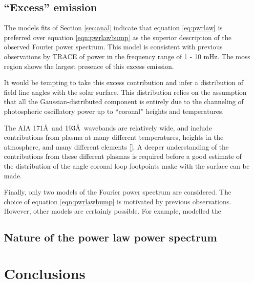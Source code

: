 \documentclass[manuscript]{../aastex52/aastex}
\begin{document}
\subsection{``Excess'' emission}\label{ssec:excess}
The models fits of Section \ref{sec:anal} indicate that equation
\ref{eq:pwrlaw} is preferred over equation \ref{eqn:pwrlawbump} as the
superior description of the observed Fourier power spectrum.  This
model is consistent with previous observations by TRACE of power in
the frequency range of 1 - 10 mHz.  The moss region shows the largest
presence of this excess emission.

It would be tempting to take this excess contribution and infer a
distribution of field line angles with the solar surface.  This
distribution relies on the assumption that all the
Gaussian-distributed component is entirely due to the channeling of
photospheric oscillatory power up to ``coronal'' heights and
temperatures.


The AIA 171\AA\ and 193\AA\ wavebands are relatively wide, and include
contributions from plasma at many different temperatures, heights in
the atmosphere, and many different elements \ref{}.  A deeper
understanding of the contributions from these different plasmas is
required before a good estimate of the distribution of the angle
coronal loop footpoints make with the surface can be made.

Finally, only two models of the Fourier power spectrum are considered.
The choice of equation \ref{eqn:pwrlawbump} is motivated by previous
observations.  However, other models are certainly possible.  For
example, \cite{1993ASPC...42..111H} modelled the


\subsection{Nature of the power law power spectrum}\label{ssec:nplps}


\section{Conclusions}\label{sec:conc}



\end{document}
